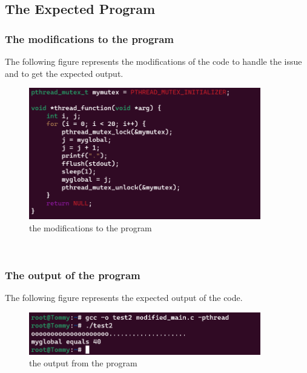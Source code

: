 \documentclass[a4paper,12pt,fleqn]{article}
\begin{document}
\begin{enumerate}
\subsection{The Expected Program}
\subsubsection{The modifications to the program}
	The following figure represents the modifications of the code to handle the issue and to get the expected output.\\
	\begin{figure}[h]
	\centering
	\includegraphics[width=0.9\textwidth]{output3.png}
	\caption{the modifications to the program}
	\label{fig:terminal output}
	\end{figure}\\
\subsubsection{The output of the program}
	The following figure represents the expected output of the code.
	\begin{figure}[h]
	\centering
	\includegraphics[width=0.9\textwidth]{output2.png}
	\caption{the output from the program}
	\label{fig:terminal output}
	\end{figure}
\end{enumerate}

\label{finalpage}
\end{document}
